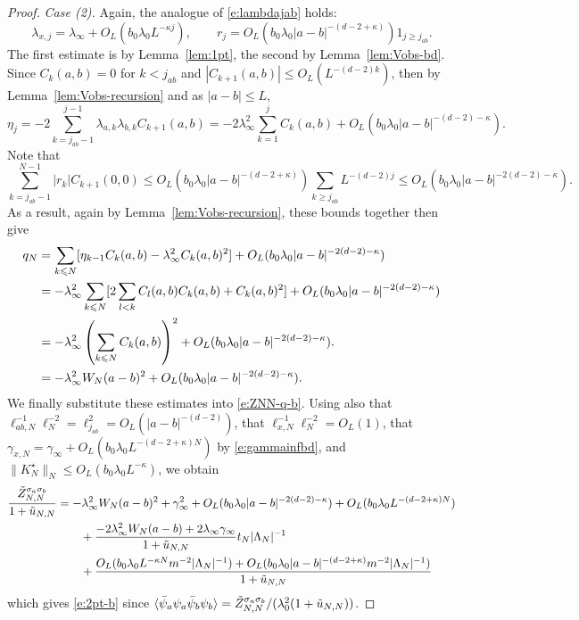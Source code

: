 \documentclass[11pt]{amsart}
\numberwithin{equation}{section}
\numberwithin{theorem}{section}
\newcommand{\1}{{\bf 1}}
\newcommand{\obs}{\star}
\newcommand{\Kobs}{K^\obs}
\newcommand{\ellxN}{\ell_{x,N}}
\newcommand{\ellabN}{\ell_{ab,N}}
\newcommand{\OL}{O_L}
\begin{document}
\begin{proof}
  \medskip\noindent\emph{Case (2).}
  Again, the analogue of \eqref{e:lambdajab} holds: 
  \begin{equation}
  \label{e:lastone}
    \lambda_{x,j} = \lambda_\infty + \OL(b_0\lambda_0 L^{-\kappa j})
    ,\qquad
    r_{j} = \OL(b_0\lambda_0|a-b|^{-(d-2+\kappa)})1_{j\geq j_{ab}}
    .
  \end{equation}
  The first estimate is by Lemma~\ref{lem:1pt},
  the second by Lemma~\ref{lem:Vobs-bd}.
  Since $C_{k}(a,b)=0$ for $k<j_{ab}$ and $|C_{k+1}(a,b)| \leq \OL(L^{-(d-2)k})$,
  then by Lemma~\ref{lem:Vobs-recursion} and as $|a-b|\leq L$,
  \begin{equation}
    \eta_{j}
    =
    -2 \sum_{k=j_{ab}-1}^{j-1} \lambda_{a,k}\lambda_{b,k} C_{k+1}(a,b)
    =
    -2 \lambda_\infty^2 \sum_{k=1}^{j} C_k(a,b) + \OL(b_0\lambda_0|a-b|^{-(d-2)-\kappa}).
  \end{equation}
  Note that
  \begin{equation}
    \sum_{{k=j_{ab}-1}}^{{N-1}}
    |r_{k}| C_{k+1}(0,0)
    \leq \OL(b_0\lambda_0|a-b|^{-(d-2+\kappa)})\sum_{k\geq j_{ab}}
    L^{-(d-2)j}
    \leq \OL(b_0\lambda_0|a-b|^{-2(d-2)-\kappa}).
  \end{equation}
  As a result, again by Lemma~\ref{lem:Vobs-recursion}, these bounds together then give
  \begin{align}
    q_{N}
    &= \sum_{k\leq N} [\eta_{k-1} C_{k}(a,b) - \lambda_\infty^2 C_k(a,b)^2]
      + \OL(b_0\lambda_0|a-b|^{-2(d-2)-\kappa})
      \nnb
    &= - \lambda_\infty^2\sum_{k\leq N} [2\sum_{l < k} C_{l}(a,b)C_k(a,b) + C_k(a,b)^2] + \OL(b_0\lambda_0|a-b|^{-2(d-2)-\kappa})
      \nnb
    &
      = - \lambda_\infty^2 \pa{ \sum_{k\leq N} C_k(a,b)}^2 + \OL(b_0\lambda_0|a-b|^{-2(d-2)-\kappa}).
      \nnb
    &
      = - \lambda_\infty^2 W_N(a-b)^2 + \OL(b_0\lambda_0|a-b|^{-2(d-2)-\kappa}).
  \end{align}
  We finally substitute these estimates into \eqref{e:ZNN-q-b}.
  Using also that $\ellabN^{-1}\ell_N^{-2} = \ell_{j_{ab}}^{2} = \OL(|a-b|^{-(d-2)})$,
  that $\ellxN^{-1}\ell_N^{-2} = \OL(1)$,
  that $\gamma_{x,N}=\gamma_\infty+\OL(b_0\lambda_0L^{-(d-2+\kappa)N})$ by \eqref{e:gammainfbd},
  and $\|\Kobs_N\|_N \leq \OL(b_0\lambda_0L^{-\kappa})$,
  we obtain
  \begin{align}
      \frac{\tilde Z^{\sigma_a\sigma_b}_{N,N}}{1+\tilde u_{N,N}}
      &= -\lambda_\infty^2 W_N(a-b)^2 + \gamma_\infty^2
        +\OL(b_0\lambda_0|a-b|^{-2(d-2)-\kappa}) +  \OL(b_0\lambda_0L^{-(d-2+\kappa)N})
      \nnb
      &\qquad
        +\frac{-2\lambda_\infty^2 W_N(a-b)
        + 2\lambda_{\infty}\gamma_{\infty} 
        }{1+\tilde u_{N,N}}t_N|\Lambda_N|^{-1}
      \nnb
      &\qquad
        + \frac{
        \OL(b_0\lambda_0L^{-\kappa N}m^{-2}|\Lambda_N|^{-1}) + \OL(b_0\lambda_0|a-b|^{-(d-2+\kappa)}m^{-2}|\Lambda_N|^{-1})}{1+\tilde u_{N,N}}
    \end{align}
  which gives   \eqref{e:2pt-b} since $\langle \bar\psi_a\psi_a\bar\psi_b\psi_b \rangle = \tilde Z_{N,N}^{\sigma_a\sigma_b}/(\lambda_0^2(1+\tilde u_{N,N}))$.
\end{proof}
\end{document}

